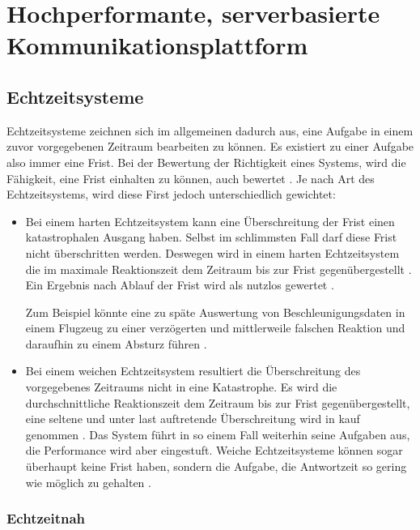 
\chapter{Hochperformante, serverbasierte Kommunikationsplattform}
	\label{com_plattform}
	\section{Echtzeitsysteme}
		Echtzeitsysteme zeichnen sich im allgemeinen dadurch aus, eine Aufgabe in einem zuvor vorgegebenen Zeitraum bearbeiten zu können.
		Es existiert zu einer Aufgabe also immer eine Frist.
		Bei der Bewertung der Richtigkeit eines Systems, wird die Fähigkeit, eine Frist einhalten zu können, auch bewertet \cite[2]{perf:buttazzo2006soft}.
		Je nach Art des Echtzeitsystems, wird diese First jedoch unterschiedlich gewichtet:
		
		\begin{itemize}
			\item Bei einem harten Echtzeitsystem kann eine Überschreitung der Frist einen katastrophalen Ausgang haben.
			Selbst im schlimmsten Fall darf diese Frist nicht überschritten werden.
			Deswegen wird in einem harten Echtzeitsystem die im maximale Reaktionszeit dem Zeitraum bis zur Frist gegenübergestellt \cite[75]{douglass2003real}.
			Ein Ergebnis nach Ablauf der Frist wird als nutzlos gewertet \cite[2]{perf:wang2017real}.
			
			Zum Beispiel könnte eine zu späte Auswertung von Beschleunigungsdaten in einem Flugzeug zu einer verzögerten und mittlerweile falschen Reaktion und daraufhin zu einem Absturz führen \cite[5]{perf:laplante2004real}.
			
			\item Bei einem weichen Echtzeitsystem resultiert die Überschreitung des vorgegebenes Zeitraums nicht in eine Katastrophe.
			Es wird die durchschnittliche Reaktionszeit dem Zeitraum bis zur Frist gegenübergestellt, eine seltene und unter last auftretende Überschreitung wird in kauf genommen \cite[76]{douglass2003real}.
			Das System führt in so einem Fall weiterhin seine Aufgaben aus, die Performance wird aber  eingestuft.
			Weiche Echtzeitsysteme können sogar überhaupt keine Frist haben, sondern die Aufgabe, die Antwortzeit so gering wie möglich zu gehalten \cite[4]{perf:buttazzo2006soft}.
		\end{itemize}
		
		
		
		
		\subsection{Echtzeitnah}
			\label{com:near_real_time}
			

